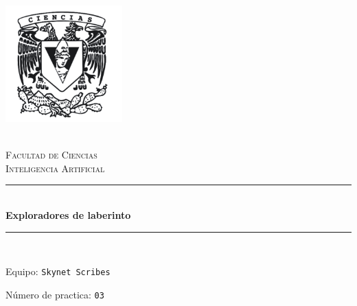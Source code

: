 \begin{titlepage}
\center 
\newcommand{\HRule}{\rule{\linewidth}{0.5mm}} 

\includegraphics[width=4.5cm]{IMA/cienciasWhite.png}

\quad \\[0.2cm]
\textsc{\huge Facultad de Ciencias}\\[.6cm] 
\textsc{\huge Inteligencia Artificial}\\[0.5cm]

\makeatletter
    \HRule \\ [0.4cm]
        { \huge \bfseries Exploradores de laberinto}\\
    \HRule \\ [0.4cm]
    
\vspace{2mm}

\begin{flushleft}
    \Large{Equipo:} \texttt{\Large Skynet Scribes}
\end{flushleft}
\begin{flushleft}
    \Large{Número de practica:} \texttt{\Large 03}\\[0.8cm]
\end{flushleft}


\begin{minipage}{0.8\textwidth}
    \begin{flushright}
    \end{flushright}
\end{minipage}

\vspace{5mm}


\end{titlepage}
